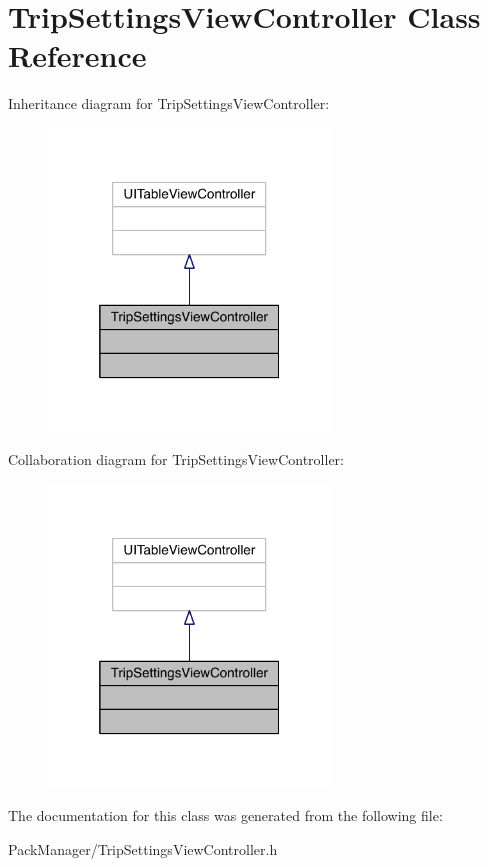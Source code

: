 \hypertarget{interface_trip_settings_view_controller}{\section{Trip\-Settings\-View\-Controller Class Reference}
\label{interface_trip_settings_view_controller}
}


Inheritance diagram for Trip\-Settings\-View\-Controller\-:\nopagebreak
\begin{figure}[H]
\begin{center}
\leavevmode
\includegraphics[width=212pt]{interface_trip_settings_view_controller__inherit__graph}
\end{center}
\end{figure}


Collaboration diagram for Trip\-Settings\-View\-Controller\-:\nopagebreak
\begin{figure}[H]
\begin{center}
\leavevmode
\includegraphics[width=212pt]{interface_trip_settings_view_controller__coll__graph}
\end{center}
\end{figure}


The documentation for this class was generated from the following file\-:\begin{DoxyCompactItemize}
\item 
Pack\-Manager/Trip\-Settings\-View\-Controller.\-h\end{DoxyCompactItemize}
